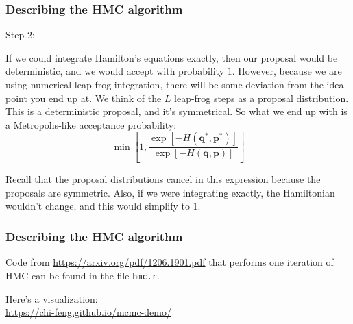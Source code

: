 \documentclass{beamer}
\begin{document}
\begin{frame}
\frametitle{Describing the HMC algorithm}

Step 2: 
\newline

If we could integrate Hamilton's equations exactly, then our proposal would be deterministic, and we would accept with probability $1$. However, because we are using numerical leap-frog integration, there will be some deviation from the ideal point you end up at. We think of the $L$ leap-frog steps as a proposal distribution. This is a deterministic proposal, and it's symmetrical. So what we end up with is a Metropolis-like acceptance probability:
$$
\min\left[1, \frac{\exp\left[ -H(\mathbf{q}^*,\mathbf{p}^*) \right]}{\exp\left[ -H(\mathbf{q},\mathbf{p}) \right] } \right]
$$

Recall that the proposal distributions cancel in this expression because the proposals are symmetric. Also, if we were integrating exactly, the Hamiltonian wouldn't change, and this would simplify to $1$.


\end{frame}

\begin{frame}[fragile]
\frametitle{Describing the HMC algorithm}

Code from \url{https://arxiv.org/pdf/1206.1901.pdf} that performs one iteration of HMC can be found in the file \verb|hmc.r|.
\newline

Here's a visualization:\\
\url{https://chi-feng.github.io/mcmc-demo/}


\end{frame}
\end{document}
